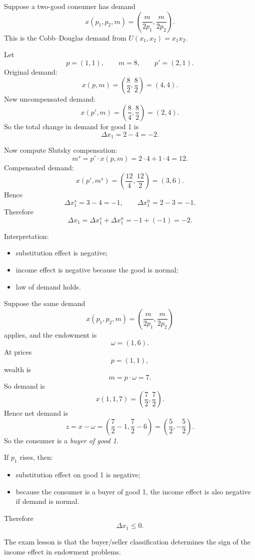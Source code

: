 \begin{examplebox}[title={Worked Review Example 2: Slutsky decomposition and the law of demand}]
Suppose a two-good consumer has demand
\[
x(p_1,p_2,m)=\left(\frac{m}{2p_1},\frac{m}{2p_2}\right).
\]
This is the Cobb--Douglas demand from $U(x_1,x_2)=x_1x_2$.

Let
\[
p=(1,1), \qquad m=8,
\qquad
p'=(2,1).
\]
Original demand:
\[
x(p,m)=\left(\frac{8}{2},\frac{8}{2}\right)=(4,4).
\]
New uncompensated demand:
\[
x(p',m)=\left(\frac{8}{4},\frac{8}{2}\right)=(2,4).
\]
So the total change in demand for good 1 is
\[
\Delta x_1 = 2-4=-2.
\]

Now compute Slutsky compensation:
\[
m^s = p' \cdot x(p,m) = 2\cdot 4 + 1\cdot 4 = 12.
\]
Compensated demand:
\[
x(p',m^s)=\left(\frac{12}{4},\frac{12}{2}\right)=(3,6).
\]
Hence
\[
\Delta x_1^s = 3-4=-1,
\qquad
\Delta x_1^n = 2-3=-1.
\]
Therefore
\[
\Delta x_1=\Delta x_1^s+\Delta x_1^n=-1+(-1)=-2.
\]

Interpretation:
\begin{itemize}
    \item substitution effect is negative;
    \item income effect is negative because the good is normal;
    \item law of demand holds.
\end{itemize}
\end{examplebox}

\begin{examplebox}[title={Worked Review Example 3: endowment buyer versus seller}]
Suppose the same demand
\[
x(p_1,p_2,m)=\left(\frac{m}{2p_1},\frac{m}{2p_2}\right)
\]
applies, and the endowment is
\[
\omega=(1,6).
\]
At prices
\[
p=(1,1),
\]
wealth is
\[
m=p\cdot \omega=7.
\]
So demand is
\[
x(1,1,7)=\left(\frac72,\frac72\right).
\]
Hence net demand is
\[
z = x-\omega = \left(\frac72-1,\frac72-6\right)=\left(\frac52,-\frac52\right).
\]
So the consumer is a \emph{buyer of good 1}.

If $p_1$ rises, then:
\begin{itemize}
    \item substitution effect on good 1 is negative;
    \item because the consumer is a buyer of good 1, the income effect is also negative if demand is normal.
\end{itemize}
Therefore
\[
\boxed{\Delta x_1 \le 0.}
\]

The exam lesson is that the buyer/seller classification determines the sign of the income effect in endowment problems.
\end{examplebox}


